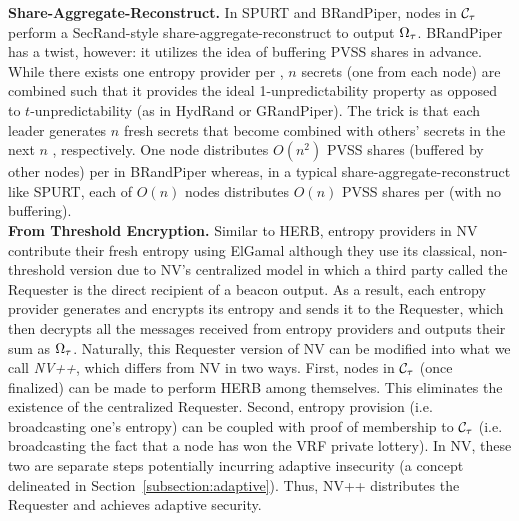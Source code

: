 \noindent\textbf{Share-Aggregate-Reconstruct.} In SPURT and BRandPiper, nodes in $\mathcal{C}_\tau$ perform a SecRand-style share-aggregate-reconstruct to output $\Omega_\tau$. BRandPiper has a twist, however: it utilizes the idea of buffering PVSS shares in advance. While there exists one entropy provider per \epoch, $n$ secrets (one from each node) are combined such that it provides the ideal 1-unpredictability property as opposed to $t$-unpredictability (as in HydRand or GRandPiper). The trick is that each \epoch leader generates $n$ fresh secrets that become combined with others' secrets in the next $n$ \epochs, respectively. One node distributes $O(n^2)$ PVSS shares (buffered by other nodes) per \epoch in BRandPiper whereas, in a typical share-aggregate-reconstruct like SPURT, each of $O(n)$ nodes distributes $O(n)$ PVSS shares per \epoch (with no buffering).\\

\noindent\textbf{From Threshold Encryption.} Similar to HERB, entropy providers in NV~\cite{nguyen2019scalable} contribute their fresh entropy using ElGamal although they use its classical, non-threshold version due to NV's centralized model in which a third party called the Requester is the direct recipient of a beacon output. As a result, each entropy provider generates and encrypts its entropy and sends it to the Requester, which then decrypts all the messages received from entropy providers and outputs their sum as $\Omega_\tau$. Naturally, this Requester version of NV can be modified into what we call \textit{NV++}, which differs from NV in two ways. First, nodes in $\mathcal{C}_\tau$ (once finalized) can be made to perform HERB among themselves. This eliminates the existence of the centralized Requester. Second, entropy provision (i.e. broadcasting one's entropy) can be coupled with proof of membership to $\mathcal{C}_\tau$ (i.e. broadcasting the fact that a node has won the VRF private lottery). In NV, these two are separate steps potentially incurring adaptive insecurity (a concept delineated in Section~\ref{subsection:adaptive}). Thus, NV++ distributes the Requester and achieves adaptive security.

